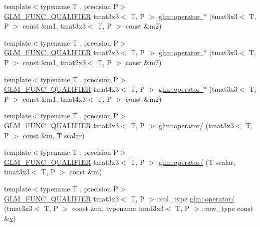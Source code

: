 \begin{DoxyCompactItemize}
\item 
{\footnotesize template$<$typename T , precision P$>$ }\\\mbox{\hyperlink{setup_8hpp_a33fdea6f91c5f834105f7415e2a64407}{G\+L\+M\+\_\+\+F\+U\+N\+C\+\_\+\+Q\+U\+A\+L\+I\+F\+I\+ER}} tmat3x3$<$ T, P $>$ \mbox{\hyperlink{namespaceglm_af63c0a85147d52409acbbf45e4406b1a}{glm\+::operator $\ast$}} (tmat3x3$<$ T, P $>$ const \&m1, tmat3x3$<$ T, P $>$ const \&m2)
\item 
{\footnotesize template$<$typename T , precision P$>$ }\\\mbox{\hyperlink{setup_8hpp_a33fdea6f91c5f834105f7415e2a64407}{G\+L\+M\+\_\+\+F\+U\+N\+C\+\_\+\+Q\+U\+A\+L\+I\+F\+I\+ER}} tmat2x3$<$ T, P $>$ \mbox{\hyperlink{namespaceglm_abccb6d8980d93cdb21b0e388c7b86199}{glm\+::operator $\ast$}} (tmat3x3$<$ T, P $>$ const \&m1, tmat2x3$<$ T, P $>$ const \&m2)
\item 
{\footnotesize template$<$typename T , precision P$>$ }\\\mbox{\hyperlink{setup_8hpp_a33fdea6f91c5f834105f7415e2a64407}{G\+L\+M\+\_\+\+F\+U\+N\+C\+\_\+\+Q\+U\+A\+L\+I\+F\+I\+ER}} tmat4x3$<$ T, P $>$ \mbox{\hyperlink{namespaceglm_ad9127375ff94a1edc531a15cac0bf2fa}{glm\+::operator $\ast$}} (tmat3x3$<$ T, P $>$ const \&m1, tmat4x3$<$ T, P $>$ const \&m2)
\item 
{\footnotesize template$<$typename T , precision P$>$ }\\\mbox{\hyperlink{setup_8hpp_a33fdea6f91c5f834105f7415e2a64407}{G\+L\+M\+\_\+\+F\+U\+N\+C\+\_\+\+Q\+U\+A\+L\+I\+F\+I\+ER}} tmat3x3$<$ T, P $>$ \mbox{\hyperlink{namespaceglm_ac5116f26b12e5e1750a14423264fbc36}{glm\+::operator/}} (tmat3x3$<$ T, P $>$ const \&m, T scalar)
\item 
{\footnotesize template$<$typename T , precision P$>$ }\\\mbox{\hyperlink{setup_8hpp_a33fdea6f91c5f834105f7415e2a64407}{G\+L\+M\+\_\+\+F\+U\+N\+C\+\_\+\+Q\+U\+A\+L\+I\+F\+I\+ER}} tmat3x3$<$ T, P $>$ \mbox{\hyperlink{namespaceglm_a7a1b2a5332cd70c694c6a0dd64485325}{glm\+::operator/}} (T scalar, tmat3x3$<$ T, P $>$ const \&m)
\item 
{\footnotesize template$<$typename T , precision P$>$ }\\\mbox{\hyperlink{setup_8hpp_a33fdea6f91c5f834105f7415e2a64407}{G\+L\+M\+\_\+\+F\+U\+N\+C\+\_\+\+Q\+U\+A\+L\+I\+F\+I\+ER}} tmat3x3$<$ T, P $>$\+::col\+\_\+type \mbox{\hyperlink{namespaceglm_ae0b7424ac335fe54c985e67c531176c0}{glm\+::operator/}} (tmat3x3$<$ T, P $>$ const \&m, typename tmat3x3$<$ T, P $>$\+::row\+\_\+type const \&\mbox{\hyperlink{glad_8h_a14cfbe2fc2234f5504618905b69d1e06}{v}})

\end{DoxyCompactItemize}
